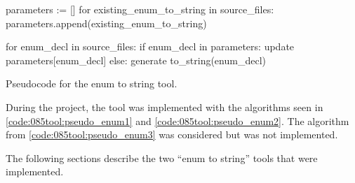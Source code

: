 \begin{listing}[H]
    \begin{pythoncode}
parameters := []
for existing_enum_to_string in source_files:
    parameters.append(existing_enum_to_string)

for enum_decl in source_files:
    if enum_decl in parameters:
        update parameters[enum_decl]
    else:
        generate to_string(enum_decl)
    \end{pythoncode}
    \caption{Pseudocode for the enum to string tool.}
    \label{code:085tool:pseudo_enum3}
\end{listing}

During the project, the tool was implemented with the algorithms seen in \cref{code:085tool:pseudo_enum1} and \cref{code:085tool:pseudo_enum2}. The algorithm from \cref{code:085tool:pseudo_enum3} was considered but was not implemented.

The following sections describe the two ``enum to string'' tools that were implemented. 